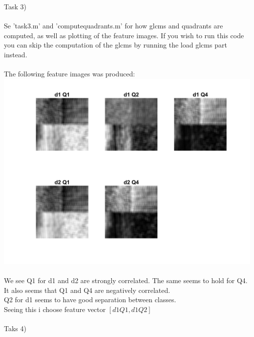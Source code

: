 \documentclass[12pt, letterpaper, twoside]{article}
\begin{document}
Task 3)\\
\ \\
Se 'task3.m' and 'computequadrants.m' for how glcms and quadrants are computed, as well as plotting of the feature images. If you wish to run this code you can skip the computation of the glcms by running the load glcms part instead.\\
\ \\
The following feature images was produced:\\
\includegraphics[scale=0.49]{"task3_quadrants.png"}\\
\ \\
We see Q1 for d1 and d2 are strongly correlated. The same seems to hold for Q4.\\
It also seems that Q1 and Q4 are negatively correlated.\\
Q2 for d1 seems to have good separation between classes.\\ 
Seeing this i choose feature vector $[d1 Q1, d1 Q2]$\\
\ \\
Taks 4)\\
\ \\
\end{document}
